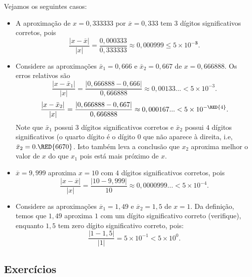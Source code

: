 \begin{ex} Vejamos os seguintes casos:
\begin{itemize}
\item[a)] A aproximação de $x=0,333333$ por $\overline{x}=0,333$ tem $3$ dígitos significativos corretos, pois
  \begin{equation}
    \frac{|x-\overline{x}|}{|x|} = \frac{0,000333}{0,333333} \approx 0,000999 \leq 5\times 10^{-\pmb{3}}.
  \end{equation}
\item[b)] Considere as aproximações $\bar{x}_1=0,666$ e $\bar{x}_2=0,667$ de $x=0,666888$. Os erros relativos são
  \begin{equation}
    \frac{|x-\bar{x}_1|}{|x|} = \frac{|0,666888-0,666|}{0,666888} \approx 0,00133...< 5\times 10^{-3}.
  \end{equation}
  \begin{equation}
    \frac{|x-\bar{x}_2|}{|x|} = \frac{|0,666888-0,667|}{0,666888} \approx 0,000167...< 5\times 10^{-\RED{4}}.
  \end{equation}
  Note que $\bar{x}_1$ possui $3$ dígitos significativos corretos e $\bar{x}_2$ possui $4$ dígitos significativos (o quarto dígito é o dígito $0$ que não aparece à direita, i.e, $\bar{x}_2=0.\RED{6670}$. Isto também leva a conclusão que $x_2$ aproxima melhor o valor de $x$ do que $x_1$ pois está mais próximo de $x$.

\item[c)] $\overline{x} = 9,999$ aproxima $x = 10$ com $4$ dígitos significativos corretos, pois
  \begin{equation}
    \frac{|x-\overline{x}|}{|x|} = \frac{|10 - 9,999|}{10} \approx 0,0000999...< 5\times 10^{-4}.
  \end{equation}
\item[d)] Considere as aproximações $\overline{x}_1 = 1,49$ e $\overline{x}_2 = 1,5$ de $x = 1$. Da definição, temos que $1,49$ aproxima $1$ com um dígito significativo correto (verifique), enquanto $1,5$ tem zero dígito significativo correto, pois:
  \begin{equation}
    \frac{|1-1,5|}{|1|} = 5\times 10^{-1} < 5\times 10^{0}.
  \end{equation}
\end{itemize}
\end{ex}

\subsection*{Exercícios}

